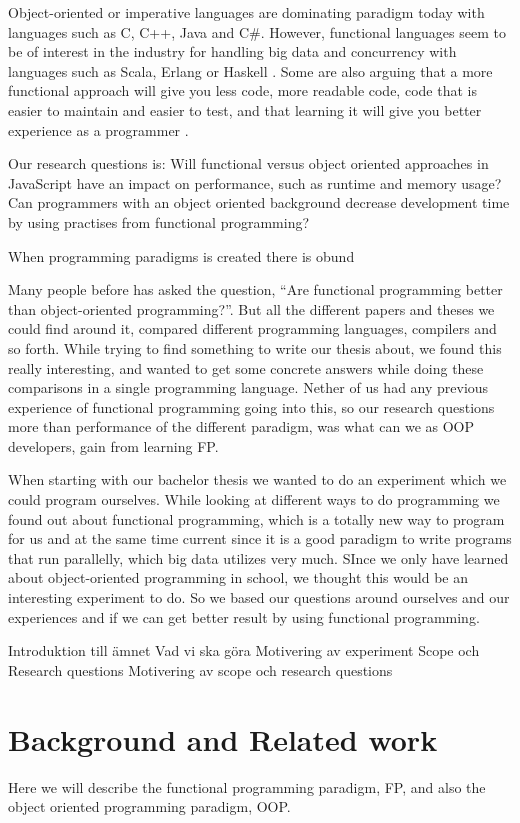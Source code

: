 \documentclass {article}
\begin{document}
Object-oriented or imperative languages are dominating paradigm today with languages such as C, C++, Java and C\#. However, functional languages seem to be of interest in the industry for handling big data and concurrency with languages such as Scala, Erlang or Haskell \cite{drboolean, eriksen, erikarl}. Some are also arguing that a more functional approach will give you less code, more readable code, code that is easier to maintain and easier to test, and that learning it will give you better experience as a programmer \cite{drboolean, meijer}.

Our research questions is:
Will functional versus object oriented approaches in JavaScript have an impact on performance, such as runtime and memory usage?
Can programmers with an object oriented background decrease development time by using practises from functional programming?

When programming paradigms is created there is obund

Many people before has asked the question, “Are functional programming better than object-oriented programming?”. But all the different papers and theses we could find around it, compared different programming languages, compilers and so forth. While trying to find something to write our thesis about, we found this really interesting, and wanted to get some concrete answers while doing these comparisons in a single programming language. Nether of us had any previous experience of functional programming going into this, so our research questions more than performance of the different paradigm, was what can we as OOP developers, gain from learning FP.

When starting with our bachelor thesis we wanted to do an experiment which we could program ourselves. While looking at different ways to do programming we found out about functional programming, which is a totally new way to program for us and at the same time current since it is a good paradigm to write programs that run parallelly, which big data utilizes very much. SInce we only have learned about object-oriented programming in school, we thought this would be an interesting experiment to do. So we based our questions around ourselves and our experiences and if we can get better result by using functional programming. 

Introduktion till ämnet
Vad vi ska göra
Motivering av experiment
Scope och Research questions
Motivering av scope och research questions
\section{Background and Related work}
Here we will describe the functional programming paradigm, FP, and also the object oriented programming paradigm, OOP. 
\end{document}
